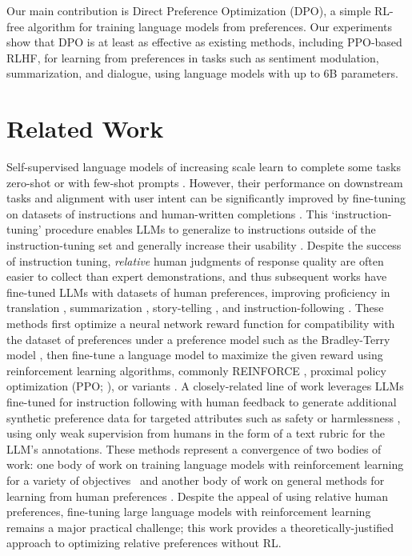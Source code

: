 Our main contribution is {Direct Preference Optimization} (DPO), a simple RL-free algorithm for training language models from preferences. Our experiments show that {DPO} is at least as effective as existing methods, including PPO-based RLHF, for learning from preferences in tasks such as sentiment modulation, summarization, and dialogue, using language models with up to 6B parameters.

\section{Related Work}

Self-supervised language models of increasing scale learn to complete some tasks zero-shot \citep{radford2019language} or with few-shot prompts \citep{gpt3,megatron,chowdhery2022palm}. However, their performance on downstream tasks and alignment with user intent can be significantly improved by fine-tuning on datasets of instructions and human-written completions \citep{mishra-etal-2022-cross,sanh2022multitask,chung2022scaling,thoppilan2022lamda}. This `instruction-tuning' procedure enables LLMs to generalize to instructions outside of the instruction-tuning set and generally increase their usability \citep{chung2022scaling}. Despite the success of instruction tuning, \textit{relative} human judgments of response quality are often easier to collect than expert demonstrations, and thus subsequent works have fine-tuned LLMs with datasets of human preferences, improving proficiency in translation \citep{kreutzer-etal-2018-reliability}, summarization \citep{stiennon2022learning,ziegler2020finetuning}, story-telling \citep{ziegler2020finetuning}, and instruction-following \citep{ouyang2022training,ramamurthy2023is}. These methods first optimize a neural network reward function for compatibility with the dataset of preferences under a preference model such as the Bradley-Terry model \citep{bradley1952rankanalysis}, then fine-tune a language model to maximize the given reward using reinforcement learning algorithms, commonly REINFORCE \citep{williams1992reinforce}, proximal policy optimization (PPO; \cite{schulman2017proximal}), or variants \citep{ramamurthy2023is}. A closely-related line of work leverages LLMs fine-tuned for instruction following with human feedback to generate additional synthetic preference data for targeted attributes such as safety or harmlessness \citep{bai2022constitutional}, using only weak supervision from humans in the form of a text rubric for the LLM's annotations. These methods represent a convergence of two bodies of work: one body of work on training language models with reinforcement learning for a variety of objectives~\citep{Ranzato2015SequenceLT,paulus2018a,wu2018learning} and another body of work on general methods for learning from human preferences \citep{christiano2017deep,kupcsik2018learning}. Despite the appeal of using relative human preferences, fine-tuning large language models with reinforcement learning remains a major practical challenge; this work provides a theoretically-justified approach to optimizing relative preferences without RL.

